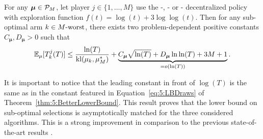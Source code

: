 \begin{lemma}\label{lem:5:SubOptimalSelections}
  For any $\boldsymbol{\mu}\in\mathcal{P}_M$,
  let player $j\in\{1,\dots,M\}$ use the \RandTopM-, \MCTopM- or \rhoRand-\klUCB{}
  decentralized policy with exploration function $f(t) = \log(t) + 3 \log\log(t)$.
  Then for any sub-optimal arm $k \in M\text{-}\mathrm{worst}$, there exists two problem-dependent positive constants $C_{\boldsymbol{\mu}}, D_{\boldsymbol{\mu}} > 0$ such that
  \begin{equation}\label{eq:5:SubOptimalSelections}
      \mathbb{E}_{\mu}[T_k^j(T)] \leq
      \frac{\ln(T)}{\mathrm{kl}(\mu_k,\mu_{M}^*)}
      + \underbrace{C_{\boldsymbol{\mu}} \sqrt{\ln(T)} + D_{\boldsymbol{\mu}}\ln\ln(T) + 3M + 1}_{= \mathop{}\mathopen{}o\mathopen{}\left(\ln(T)\right)}.
  \end{equation}
\end{lemma}

It is important to notice that the leading constant in front of $\log(T)$ is the same as in the constant featured in Equation~\eqref{eq:5:LBDraws} of Theorem~\ref{thm:5:BetterLowerBound}. This result proves that the lower bound on sub-optimal selections is asymptotically matched for the three considered algorithms. This is a strong improvement in comparison to the previous state-of-the-art results
\citep{Zhao10,Anandkumar11}.

